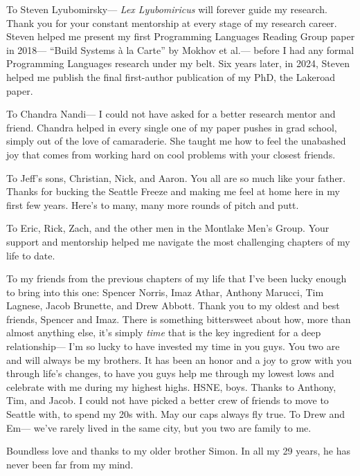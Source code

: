 To Steven Lyubomirsky---%
  \textit{Lex Lyubomiricus} will forever guide my research.
Thank you for your constant mentorship
  at every stage of my research career.
Steven helped me present my first Programming Languages
  Reading Group paper in 2018---%
  ``Build Systems \`a la Carte'' by Mokhov et al.---%
  before I had any
  formal Programming Languages research
  under my belt.
Six years later, in 2024,
  Steven helped me publish the final
  first-author publication of my PhD,
  the Lakeroad paper.
  
To Chandra Nandi---%
  I could not have asked for a better
  research mentor and friend.
Chandra helped
  in every single one of my paper pushes
  in grad school,
  simply out of the love
  of camaraderie.
She taught me how
  to feel the unabashed joy
  that comes 
  from working hard
  on cool problems
  with your closest friends.


To Jeff's sons,
  Christian, Nick, and Aaron.
You all are so much like your father.
Thanks for 
  bucking the Seattle Freeze
  and making me feel at home here
  in my first 
  few years.
Here's to 
  many, many more rounds
  of pitch and putt.

To Eric, Rick, Zach,
  and the other men in the Montlake Men's Group.
Your support
  and mentorship
  helped me navigate the most challenging chapters
  of my life to date.
  
To my friends
  from the previous chapters of my life
  that I've been lucky enough
  to bring into this one:
  Spencer Norris, Imaz Athar,
  Anthony Marucci, Tim Lagnese, Jacob Brunette,
  and Drew Abbott.
Thank you to my oldest 
  and best friends,
  Spencer and Imaz.
There is something
  bittersweet about how,
  more than almost anything else,
  it's simply \textit{time} 
  that is the key ingredient
  for a deep relationship---%
  I'm so lucky to have invested
  my time in you guys.
You two are
  and will always be
  my brothers.
It has been an honor and a joy
  to grow with you
  through life's changes,
  to have you guys help me
  through my lowest lows
  and celebrate with me during my highest highs.
HSNE, boys.
Thanks to
  Anthony, Tim, and Jacob.
I could not have picked a better crew
  of friends to move to Seattle with,
  to spend my 20s with.
May our caps always fly true.
To Drew and Em---%
  we've rarely lived in the same city,
  but you two are family to me.
  
Boundless love and thanks to my older brother Simon.
In all my 29 years,
  he has never
  been far from my mind.


